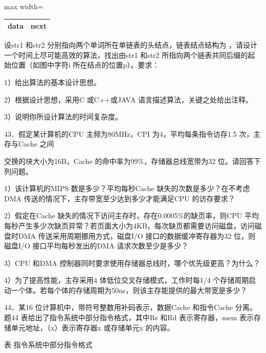 \documentclass[UTF8,11pt]{ctexart}
\begin{document}
\begin{center}\begin{adjustbox}{max width=\linewidth}\begin{tabular}{|>{\raggedright\arraybackslash}p{\dimexpr(\linewidth-4\tabcolsep-3\arrayrulewidth)/2\relax}|>{\raggedright\arraybackslash}p{\dimexpr(\linewidth-4\tabcolsep-3\arrayrulewidth)/2\relax}|}\hline
data & next\\\hline\end{tabular}\end{adjustbox}\end{center}

设str1 和str2 分别指向两个单词所在单链表的头结点，链表结点结构为 ，请设计一个时间上尽可能高效的算法，找出由str1 和str2 所指向两个链表共同后缀的起始位置（如图中字符i 所在结点的位置p）。要求：


1）给出算法的基本设计思想。


2）根据设计思想，采用C 或C++或JAVA 语言描述算法，关键之处给出注释。


3）说明你所设计算法的时间复杂度。


43．假定某计算机的CPU 主频为80MHz，CPI 为4，平均每条指令访存1.5 次，主存与Cache 之间


交换的块大小为16B，Cache 的命中率为99\%，存储器总线宽带为32 位。请回答下列问题。


1）该计算机的MIPS 数是多少？平均每秒Cache 缺失的次数是多少？在不考虑DMA 传送的情况下，主存带宽至少达到多少才能满足CPU 的访存要求？


2）假定在Cache 缺失的情况下访问主存时，存在0.0005\%的缺页率，则CPU 平均每秒产生多少次缺页异常？若页面大小为4KB，每次缺页都需要访问磁盘，访问磁盘时DMA 传送采用周期挪用方式，磁盘I/O 接口的数据缓冲寄存器为32 位，则磁盘I/O 接口平均每秒发出的DMA 请求次数至少是多少？


3）CPU 和DMA 控制器同时要求使用存储器总线时，哪个优先级更高？为什么？


4）为了提高性能，主存采用4 体低位交叉存储模式，工作时每1/4 个存储周期启动一个体。若每个体的存储周期为50ns，则该主存能提供的最大带宽是多少？


44．某16 位计算机中，带符号整数用补码表示，数据Cache 和指令Cache 分离。题44 表给出了指令系统中部分指令格式，其中Rs 和Rd 表示寄存器，mem 表示存储单元地址，（x）表示寄存器x 或存储单元x 的内容。


表 指令系统中部分指令格式
\end{document}
